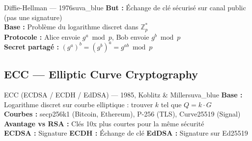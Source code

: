 \documentclass[12pt, a4paper]{article}
\begin{document}
\begin{algobox}{Diffie-Hellman --- 1976}{suva_blue}
\textbf{But :} Échange de clé sécurisé sur canal public (pas une signature)\\
\textbf{Base :} Problème du logarithme discret dans $\mathbb{Z}_p^*$\\
\textbf{Protocole :} Alice envoie $g^a \bmod p$, Bob envoie $g^b \bmod p$\\
\textbf{Secret partagé :} $(g^a)^b = (g^b)^a = g^{ab} \bmod p$
\end{algobox}

\begin{center}
\end{center}

\subsection{ECC --- Elliptic Curve Cryptography}

\begin{algobox}{ECC (ECDSA / ECDH / EdDSA) --- 1985, Koblitz \& Miller}{suva_blue}
\textbf{Base :} Logarithme discret sur courbe elliptique : trouver $k$ tel que $Q = k \cdot G$\\
\textbf{Courbes :} secp256k1 (Bitcoin, Ethereum), P-256 (TLS), Curve25519 (Signal)\\
\textbf{Avantage vs RSA :} Clés 10x plus courtes pour la même sécurité\\
\textbf{ECDSA :} Signature \quad \textbf{ECDH :} Échange de clé \quad \textbf{EdDSA :} Signature sur Ed25519
\end{algobox}
\end{document}
